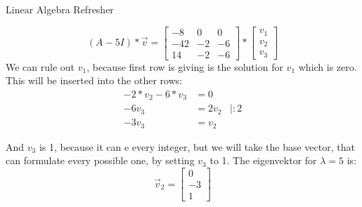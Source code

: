 \documentclass[
	english,
        solution=true
	]{tudaexercise}
\begin{document}
\begin{task}[points=28]{Linear Algebra Refresher}
\begin{subtask} [points=5,title=Matrix Decomposition]
\begin{solution}
\[(A-5I)*\vec{v}=\begin{bmatrix}
        -8 & 0 & 0 \\ -42 & -2 & -6 \\ 14 & -2 & -6
    \end{bmatrix}*\begin{bmatrix}
        v_1 \\v_2 \\v_3
    \end{bmatrix}\]
    We can rule out $v_1$, because first row is giving is the solution for $v_1$ which is zero. This will be inserted into the other rows:
    \begin{align*}
        -2*v_2-6*v_3 &= 0\\
        -6v_3&=2v_2 \,\,\,\,\, | :2 \\
        -3v_3&=v_2
    \end{align*}

    And $v_3$ is 1, because it can e every integer, but we will take the base vector, that can formulate every possible one, by setting $v_3 $ to 1. The eigenvektor for $\lambda=5$ is:
    \[\vec{v}_2=\begin{bmatrix}
        0 \\-3 \\ 1
    \end{bmatrix}\]
    
    
    
\end{solution}
\end{subtask}
\end{task}

\newpage
\end{document}
